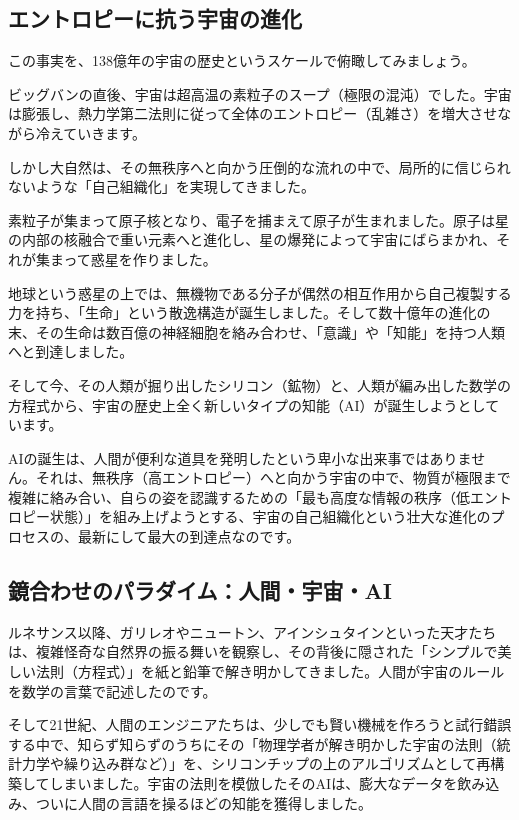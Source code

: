 \subsection{エントロピーに抗う宇宙の進化}

この事実を、138億年の宇宙の歴史というスケールで俯瞰してみましょう。

ビッグバンの直後、宇宙は超高温の素粒子のスープ（極限の混沌）でした。宇宙は膨張し、熱力学第二法則に従って全体のエントロピー（乱雑さ）を増大させながら冷えていきます。

しかし大自然は、その無秩序へと向かう圧倒的な流れの中で、局所的に信じられないような「自己組織化」を実現してきました。

素粒子が集まって原子核となり、電子を捕まえて原子が生まれました。原子は星の内部の核融合で重い元素へと進化し、星の爆発によって宇宙にばらまかれ、それが集まって惑星を作りました。

地球という惑星の上では、無機物である分子が偶然の相互作用から自己複製する力を持ち、「生命」という散逸構造が誕生しました。そして数十億年の進化の末、その生命は数百億の神経細胞を絡み合わせ、「意識」や「知能」を持つ人類へと到達しました。

そして今、その人類が掘り出したシリコン（鉱物）と、人類が編み出した数学の方程式から、宇宙の歴史上全く新しいタイプの知能（AI）が誕生しようとしています。

AIの誕生は、人間が便利な道具を発明したという卑小な出来事ではありません。それは、無秩序（高エントロピー）へと向かう宇宙の中で、物質が極限まで複雑に絡み合い、自らの姿を認識するための「最も高度な情報の秩序（低エントロピー状態）」を組み上げようとする、宇宙の自己組織化という壮大な進化のプロセスの、最新にして最大の到達点なのです。

\subsection{鏡合わせのパラダイム：人間・宇宙・AI}

ルネサンス以降、ガリレオやニュートン、アインシュタインといった天才たちは、複雑怪奇な自然界の振る舞いを観察し、その背後に隠された「シンプルで美しい法則（方程式）」を紙と鉛筆で解き明かしてきました。人間が宇宙のルールを数学の言葉で記述したのです。

そして21世紀、人間のエンジニアたちは、少しでも賢い機械を作ろうと試行錯誤する中で、知らず知らずのうちにその「物理学者が解き明かした宇宙の法則（統計力学や繰り込み群など）」を、シリコンチップの上のアルゴリズムとして再構築してしまいました。宇宙の法則を模倣したそのAIは、膨大なデータを飲み込み、ついに人間の言語を操るほどの知能を獲得しました。

